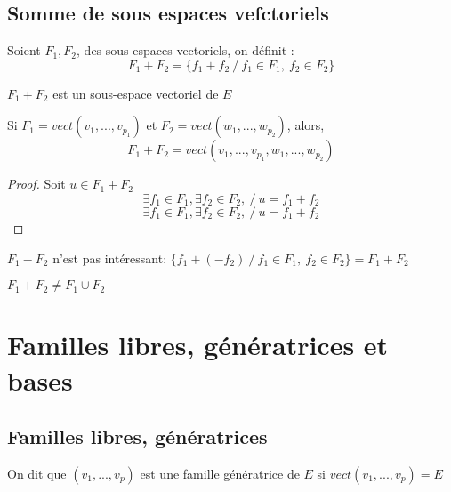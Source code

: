 \documentclass[../main.tex]{subfile}
\begin{document}
\subsection{Somme de sous espaces vefctoriels}
\begin{defi}
	Soient $F_1, F_2$, des sous espaces vectoriels, on définit :
	$$F_1 + F_2 = \{f_1 + f_2 \ / \ f_1 \in F_1 , \ f_2 \in F_2\}$$
\end{defi}

\begin{rema}
	$F_1 + F_2$ est un sous-espace vectoriel de $E$
\end{rema}

\begin{ex}
\end{ex}

\begin{prop}
	Si $F_1 = vect(v_1, ..., v_{p_1})$ et $F_2 = vect(w_1, ..., w_{p_2})$, alors, \\
	$$F_1 + F_2 = vect(v_1, ..., v_{p_1}, w_1, ..., w_{p_2})$$
\end{prop}

\begin{proof}
	Soit $u \in F_1 + F_2$\\
	$$\exists f_1 \in F_1, \exists f_2 \in F_2, \ / \ u = f_1 + f_2$$
	$$\exists f_1 \in F_1, \exists f_2 \in F_2, \ / \ u = f_1 + f_2$$
\end{proof}

\begin{rema}
	$F_1 - F_2$ n'est pas intéressant: $\{f_1 + (-f_2)\ / \ f_1 \in F_1, \ f_2 \in F_2\} = F_1 + F_2$ 
\end{rema}

\begin{rema}
	$F_1 + F_2 \neq F_1 \cup F_2$
\end{rema}

\section{Familles libres, génératrices et bases}
\subsection{Familles libres, génératrices}

\begin{defi}
	On dit que $(v_1, ..., v_p)$ est une famille génératrice de $E$ si $vect(v_1, ..., v_p) = E$
\end{defi}
\end{document}
